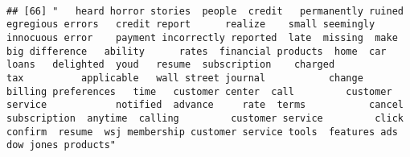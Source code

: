 \documentclass[
]{article}
\begin{document}
\begin{verbatim}
                                                                                                                                                                                                                                                                                                                                                                                                                                                                   
## [66] "   heard horror stories  people  credit   permanently ruined  egregious errors   credit report      realize    small seemingly innocuous error    payment incorrectly reported  late  missing  make  big difference   ability      rates  financial products  home  car loans   delighted  youd   resume  subscription    charged           tax          applicable   wall street journal           change  billing preferences   time   customer center  call         customer service            notified  advance     rate  terms           cancel  subscription  anytime  calling         customer service         click confirm  resume  wsj membership customer service tools  features ads  dow jones products"
\end{verbatim}
\end{document}

